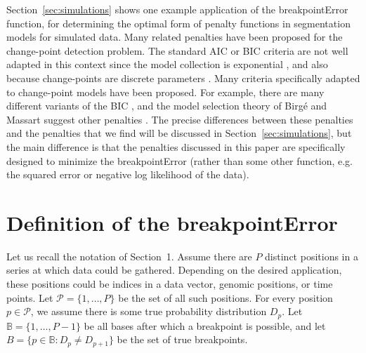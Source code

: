 \documentclass{article}
\begin{document}
Section~\ref{sec:simulations} shows one example application of the
breakpointError function, for determining the optimal form of penalty
functions in segmentation models for simulated data. Many related
penalties have been proposed for the change-point detection
problem. The standard AIC or BIC criteria are not well adapted in this
context since the model collection is exponential
\citep{BM04,BIC,Akaike73,BGH09}, and also because change-points are
discrete parameters \citep{mBIC}.  Many criteria specifically adapted
to change-point models have been proposed.  For example, there are
many different variants of the BIC \citep{Yao88,Lee95,mBIC}, and the
model selection theory of Birg\'e and Massart suggest other penalties
\citep{lavielle2005,lebarbier,BM04,calibration}. The precise
differences between these penalties and the penalties that we find
will be discussed in Section~\ref{sec:simulations}, but the main
difference is that the penalties discussed in this paper are
specifically designed to minimize the breakpointError (rather than
some other function, e.g. the squared error or negative log likelihood
of the data).


\newpage

\section{Definition of the breakpointError}
\label{sec:definition}

Let us recall the notation of Section~1. Assume there are $P$ distinct
positions in a series at which data could be gathered. Depending on
the desired application, these positions could be indices in a data
vector, genomic positions, or time points. Let $\mathcal P=
\{1,\dots,P\}$ be the set of all such positions. For every position
$p\in\mathcal P$, we assume there is some true probability
distribution $D_p$. Let $\mathbb B=\{1,\dots,P-1\}$ be all bases after
which a breakpoint is possible, and let $B = \{p\in \mathbb B : D_p
\neq D_{p+1}\}$ be the set of true breakpoints.
\end{document}
